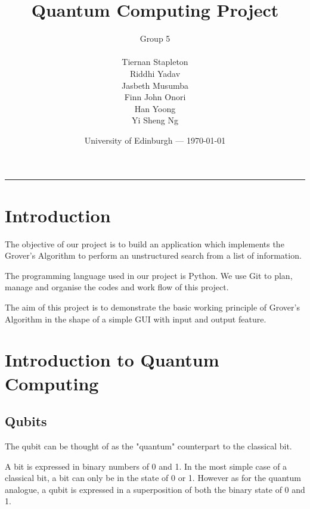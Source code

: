 \documentclass{article}
\title{Quantum Computing Project} %
\author{Group 5 \\ \\ Tiernan Stapleton\\ Riddhi Yadav\\ Jasbeth Musumba \\ Finn John Onori \\ Han Yoong  \\ Yi Sheng Ng}  %
\date{University of Edinburgh --- \today} %
\begin{document}
\onehalfspacing
\maketitle %

\vspace{10mm}
\hrule

\vspace{10mm}

\section*{Introduction} %
\vspace{10mm}

The objective of our project is to build an application which implements the Grover's Algorithm to perform an unstructured search from a list of information.
\vspace{5mm}

\noindent
The programming language used in our project is Python. We use Git to plan, manage and organise the codes and work flow of this project. 
\vspace{5mm}

\noindent
The aim of this project is to demonstrate the basic working principle of Grover's Algorithm in the shape of a simple GUI with input and output feature.
\pagebreak

\tableofcontents %
\pagebreak

\section{Introduction to Quantum Computing}
\vspace{5mm}

\subsection{Qubits}
\vspace{5mm}

The qubit can be thought of as the "quantum" counterpart to the classical bit. 
\vspace{5mm}

\noindent
A bit is expressed in binary numbers of 0 and 1. In the most simple case of a classical bit, a bit can only be in the state of 0 or 1. However as for the quantum analogue, a qubit is expressed in a superposition of both the binary state of 0 and 1.
\vspace{5mm}
\end{document}

